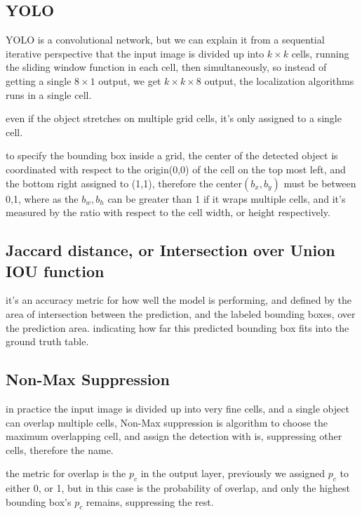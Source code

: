 \documentclass[4apaper,12pt]{book}
\begin{document}
\begin{description}
        \subsection{YOLO}
        \begin{description}
        \item YOLO is a convolutional network, but we can explain it from a sequential iterative perspective that the input image is divided up into $k\times{k}$ cells, running the sliding window function in each cell, then simultaneously, so instead of getting a single $8\times{1}$ output, we get $k\times{k}\times{8}$ output, the localization algorithms runs in a single cell.
        \item even if the object stretches on multiple grid cells, it's only assigned to a single cell.
        \item to specify the bounding box inside a grid, the center of the detected object is coordinated with respect to the origin(0,0) of the cell on the top most left, and the bottom right assigned to (1,1), therefore the center$(b_x,b_y)$ must be between 0,1, where as the $b_w,b_h$ can be greater than 1 if it wraps multiple cells, and it's measured by the ratio with respect to the cell width, or height respectively.
        \end{description}
        \subsection{Jaccard distance, or Intersection over Union IOU function}
        \begin{description}
          \item it's an accuracy metric for how well the model is performing, and defined by the area of intersection between the prediction, and the labeled bounding boxes, over the prediction area. indicating how far this predicted bounding box fits into the ground truth table.
        \end{description}
        \subsection{Non-Max Suppression}
        \begin{description}
        \item in practice the input image is divided up into very fine cells, and a single object can overlap multiple cells, Non-Max suppression is algorithm to choose the maximum overlapping cell, and assign the detection with is, suppressing other cells, therefore the name.
        \item the metric for overlap is the $p_c$ in the output layer, previously we assigned $p_c$ to either 0, or 1, but in this case is the probability of overlap, and only the highest bounding box's $p_c$ remains, suppressing the rest.
        \end{description}

\end{description}
\end{document}
